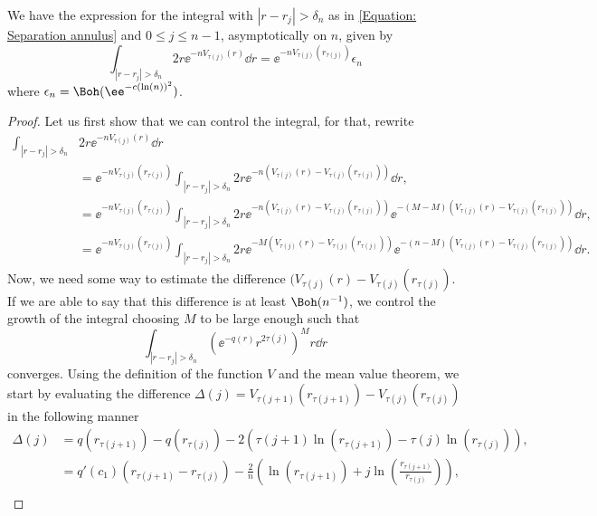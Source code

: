 \begin{lema}	\label{Lema: error annulus}
 	We have the expression for the integral  with $|r - r_j| > \delta_n$ as in \eqref{Equation: Separation annulus} and $0 \leq j \leq n-1$, asymptotically on $n$, given by
	\begin{equation}
		\int_{|r - r_j| > \delta_n} 2r \ee^{-n V_{\tau(j)}(r)} \dd r = \ee^{-n V_{\tau(j)}(r_{\tau(j)})} \epsilon_n
	\end{equation}
	where $\epsilon_n = \Boh(\ee^{-c(\ln(n))^2})$.  
\end{lema}
\begin{proof}
	Let us first show that we can control the integral, for that, rewrite
	\begin{align}
	\int_{|r - r_j| > \delta_n} & 2r \ee^{-n V_{\tau(j)}(r)} \dd r
	\\ & = \ee^{-n V_{\tau(j)}(r_{\tau(j)})} \int_{|r - r_j| > \delta_n} 2r \ee^{-n \left( V_{\tau(j)}(r) - V_{\tau(j)}(r_{\tau(j)}) \right)} \dd r, \\
		& = \ee^{-n V_{\tau(j)}(r_{\tau(j)})} \int_{|r - r_j| > \delta_n} 2r \ee^{-n \left( V_{\tau(j)}(r) - V_{\tau(j)}(r_{\tau(j)}) \right)}  \ee^{-(M-M) \left( V_{\tau(j)}(r) - V_{\tau(j)}(r_{\tau(j)}) \right)} \dd r, \\
		& = \ee^{-n V_{\tau(j)}(r_{\tau(j)})} \int_{|r - r_j| > \delta_n} 2r \ee^{-M \left( V_{\tau(j)}(r) - V_{\tau(j)}(r_{\tau(j)}) \right)}  \ee^{-(n-M) \left( V_{\tau(j)}(r) - V_{\tau(j)}(r_{\tau(j)}) \right)} \dd r.
	\end{align}
	Now, we need some way to estimate the difference $(V_{\tau(j)}(r) - V_{\tau(j)}(r_{\tau(j)})$. If we are able to say that this difference is at least $\Boh(n^{-1})$, we control the growth of the integral choosing $M$ to be large enough such that
	\begin{equation}
		\int_{|r - r_j| > \delta_n} \left( \ee^{-q(r)} r^{2 \tau(j)} \right)^M r \dd r
	\end{equation}
	converges. Using the definition of the function $V$ and the mean value theorem, we start by evaluating the difference $\Delta(j) = V_{\tau(j+1)}(r_{\tau(j+1)}) - V_{\tau(j)}(r_{\tau(j)})$ in the following manner
	\begin{align}
		\Delta(j) &= q(r_{\tau(j+1)}) - q(r_{\tau(j)}) - 2 \left( \tau(j+1) \ln(r_{\tau(j+1)}) - \tau(j) \ln(r_{\tau(j)}) \right), \\
		& = q'(c_1) (r_{\tau(j+1)} - r_{\tau(j)}) - \frac{2}{n} \left(\ln(r_{\tau(j+1)})+j\ln\left(\frac{r_{\tau(j+1)}}{r_{\tau(j)}} \right) \right), \\

\end{align}
\end{proof}
